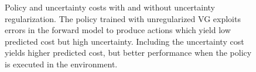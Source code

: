 \documentclass{article} %
\begin{document}
\begin{figure}[t!]
    \centering
    \caption{Policy and uncertainty costs with and without uncertainty regularization. The policy trained with unregularized VG exploits errors in the forward model to produce actions which yield low predicted cost but high uncertainty. Including the uncertainty cost yields higher predicted cost, but better performance when the policy is executed in the environment.}
    \label{svg-pred}
\end{figure}



\end{document}
